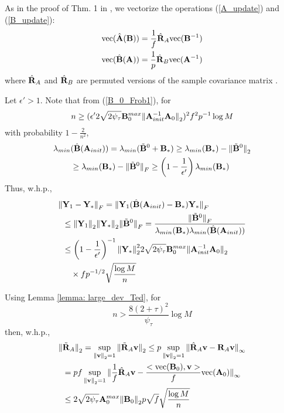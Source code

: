 \begin{IEEEproof}
As in the proof of Thm. 1 in \cite{EstCovMatKron}, we vectorize the operations (\ref{A_update}) and (\ref{B_update}):
\begin{align*}
	{ \text{vec} }(\hat{{\mathbf{A}}}({\mathbf{B}})) &= \frac{1}{f} \hat{{\mathbf{R}}}_A { \text{vec} }({\mathbf{B}}^{-1}) \\
	{ \text{vec} }(\hat{{\mathbf{B}}}({\mathbf{A}})) &= \frac{1}{p} \hat{{\mathbf{R}}}_B { \text{vec} }({\mathbf{A}}^{-1})
\end{align*}
where $\hat{{\mathbf{R}}}_A$ and $\hat{{\mathbf{R}}}_B$ are permuted versions of the sample covariance matrix \cite{EstCovMatKron}.

Let $\epsilon'>1$. Note that from (\ref{B_0_Frob1}), for
\begin{equation} \label{cond_1}
	n\geq (\epsilon' 2\sqrt{2\psi_\tau} {\mathbf{B}}_0^{max} { \parallel }{\mathbf{A}}_{init}^{-1} {\mathbf{A}}_0{ \parallel }_2)^2 f^2 p^{-1} \log M
\end{equation}
with probability $1-\frac{2}{n^2}$,
\begin{align*}
	\lambda_{min} &(\hat{{\mathbf{B}}}({\mathbf{A}}_{init})) = \lambda_{min}(\tilde{{\mathbf{B}}}^0 + {\mathbf{B}}_*) \geq \lambda_{min}({\mathbf{B}}_*) - { \parallel } \tilde{{\mathbf{B}}}^0 { \parallel }_2 \\
		&\geq \lambda_{min}({\mathbf{B}}_*) - { \parallel } \tilde{{\mathbf{B}}}^0 { \parallel }_F \geq \left( 1-\frac{1}{\epsilon'} \right) \lambda_{min}({\mathbf{B}}_*)
\end{align*}
Thus, w.h.p.,
\begin{align}
	{ \parallel } & {\mathbf{Y}}_1-{\mathbf{Y}}_* { \parallel }_F = { \parallel } {\mathbf{Y}}_1 (\hat{{\mathbf{B}}}({\mathbf{A}}_{init})-{\mathbf{B}}_*) {\mathbf{Y}}_* { \parallel }_F \nonumber \\ 
		&\leq { \parallel } {\mathbf{Y}}_1 { \parallel }_2 { \parallel } {\mathbf{Y}}_* { \parallel }_2 { \parallel } \tilde{{\mathbf{B}}}^0 { \parallel }_F = \frac{{ \parallel } \tilde{{\mathbf{B}}}^0 { \parallel }_F}{ \lambda_{min}({\mathbf{B}}_*) \lambda_{min}(\hat{{\mathbf{B}}}({\mathbf{A}}_{init})) } \nonumber \\
		&\leq \left( 1-\frac{1}{\epsilon'} \right)^{-1} { \parallel }{\mathbf{Y}}_*{ \parallel }_2^2 2\sqrt{2\psi_\tau} {\mathbf{B}}_0^{max} { \parallel }{\mathbf{A}}_{init}^{-1} {\mathbf{A}}_0{ \parallel }_2 \nonumber \\
		&\quad  \times fp^{-1/2} \sqrt{\frac{\log M}{n}} \label{bound_Frob_spec}
\end{align}

Using Lemma \ref{lemma: large_dev_Ted}, for 
\begin{equation} \label{cond_2}
	n>\frac{8(2+\tau)^2}{\psi_{\tau}} \log M
\end{equation}
then, w.h.p.,
\begin{align}
	{ \parallel } & \tilde{{\mathbf{R}}}_A{ \parallel }_2 = \sup_{{ \parallel } { \mathbf{v} } { \parallel }_2=1} { \parallel } \tilde{{\mathbf{R}}}_A { \mathbf{v} } { \parallel }_2 \leq p \sup_{{ \parallel } { \mathbf{v} } { \parallel }_2 = 1} { \parallel } \hat{{\mathbf{R}}}_A { \mathbf{v} } - {\mathbf{R}}_A { \mathbf{v} } { \parallel }_\infty \nonumber \\
		&= pf \sup_{{ \parallel } { \mathbf{v} } { \parallel }_2 = 1} { \parallel } \frac{1}{f} \hat{{\mathbf{R}}}_A { \mathbf{v} } - \frac{<{ \text{vec} }({\mathbf{B}}_0),{ \mathbf{v} }>}{f} { \text{vec} }({\mathbf{A}}_0) { \parallel }_\infty \nonumber \\
		&\leq 2\sqrt{2\psi_\tau} {\mathbf{A}}_0^{max} { \parallel }{\mathbf{B}}_0{ \parallel }_2  p\sqrt{f} \sqrt{\frac{\log M}{n}} \label{bound_mixed_norm2}
\end{align}


\end{IEEEproof}
